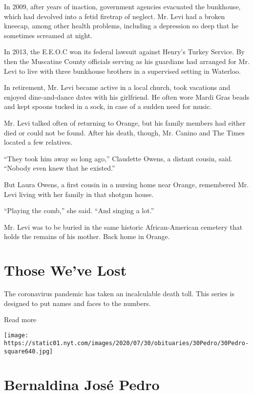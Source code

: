 In 2009, after years of inaction, government agencies evacuated the
bunkhouse, which had devolved into a fetid firetrap of neglect. Mr. Levi
had a broken kneecap, among other health problems, including a
depression so deep that he sometimes screamed at night.

In 2013, the E.E.O.C won its federal lawsuit against Henry's Turkey
Service. By then the Muscatine County officials serving as his guardians
had arranged for Mr. Levi to live with three bunkhouse brothers in a
supervised setting in Waterloo.

In retirement, Mr. Levi became active in a local church, took vacations
and enjoyed dine-and-dance dates with his girlfriend. He often wore
Mardi Gras beads and kept spoons tucked in a sock, in case of a sudden
need for music.

Mr. Levi talked often of returning to Orange, but his family members had
either died or could not be found. After his death, though, Mr. Canino
and The Times located a few relatives.

``They took him away so long ago,'' Claudette Owens, a distant cousin,
said. ``Nobody even knew that he existed.''

But Laura Owens, a first cousin in a nursing home near Orange,
remembered Mr. Levi living with her family in that shotgun house.

``Playing the comb,'' she said. ``And singing a lot.''

Mr. Levi was to be buried in the same historic African-American cemetery
that holds the remains of his mother. Back home in Orange.

\href{https://www.nytimes.com/interactive/2020/obituaries/people-died-coronavirus-obituaries.html?action=click\&pgtype=Article\&state=default\&region=BELOW_MAIN_CONTENT\&context=covid_obits_promo}{}

\hypertarget{those-weve-lost}{%
\section{Those We've Lost}\label{those-weve-lost}}

The coronavirus pandemic has taken an incalculable death toll. This
series is designed to put names and faces to the numbers.

Read more

\texttt{[image: https://static01.nyt.com/images/2020/07/30/obituaries/30Pedro/30Pedro-square640.jpg]}

\hypertarget{bernaldina-josuxe9-pedro}{%
\section{Bernaldina José Pedro}\label{bernaldina-josuxe9-pedro}}

